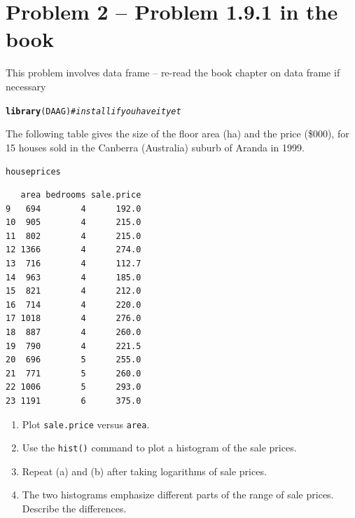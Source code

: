 \documentclass{article}\usepackage[]{graphicx}\usepackage[]{color}
\makeatletter
\newcommand{\hlcom}[1]{\textcolor[rgb]{0.678,0.584,0.686}{\textit{#1}}}%
\newcommand{\hlstd}[1]{\textcolor[rgb]{0.345,0.345,0.345}{#1}}%
\newcommand{\hlkwd}[1]{\textcolor[rgb]{0.737,0.353,0.396}{\textbf{#1}}}%
\newenvironment{kframe}{%
 \def\at@end@of@kframe{}%
 \ifinner\ifhmode%
  \def\at@end@of@kframe{\end{minipage}}%
  \begin{minipage}{\columnwidth}%
 \fi\fi%
 \def\FrameCommand##1{\hskip\@totalleftmargin \hskip-\fboxsep
 \colorbox{shadecolor}{##1}\hskip-\fboxsep
     \hskip-\linewidth \hskip-\@totalleftmargin \hskip\columnwidth}%
 \MakeFramed {\advance\hsize-\width
   \@totalleftmargin\z@ \linewidth\hsize
   \@setminipage}}%
 {\par\unskip\endMakeFramed%
 \at@end@of@kframe}
\newenvironment{knitrout}{}{} %
\makeatother
\begin{document}
\section{Problem 2 -- Problem 1.9.1 in the book}

This problem involves data frame -- re-read the book chapter on data frame if necessary
\begin{knitrout}
\color{fgcolor}\begin{kframe}
\begin{alltt}
\hlkwd{library}\hlstd{(DAAG)} \hlcom{# install if you have it yet}
\end{alltt}
\end{kframe}
\end{knitrout}

The following table gives the size of the floor area (ha) and
  the price (\$000), for 15 houses sold in the Canberra (Australia)
  suburb of Aranda in 1999.


\begin{knitrout}
\color{fgcolor}\begin{kframe}
\begin{alltt}
\hlstd{houseprices}
\end{alltt}
\begin{verbatim}
   area bedrooms sale.price
9   694        4      192.0
10  905        4      215.0
11  802        4      215.0
12 1366        4      274.0
13  716        4      112.7
14  963        4      185.0
15  821        4      212.0
16  714        4      220.0
17 1018        4      276.0
18  887        4      260.0
19  790        4      221.5
20  696        5      255.0
21  771        5      260.0
22 1006        5      293.0
23 1191        6      375.0
\end{verbatim}
\end{kframe}
\end{knitrout}


\begin{enumerate}
\item Plot \verb+sale.price+ versus \verb+area+.
\item Use the \verb+hist()+ command to plot a histogram of the sale prices.
\item Repeat (a) and (b) after taking logarithms of sale prices.
\item The two histograms emphasize different parts of the range of sale prices. Describe the differences.
\end{enumerate}
\end{document}

